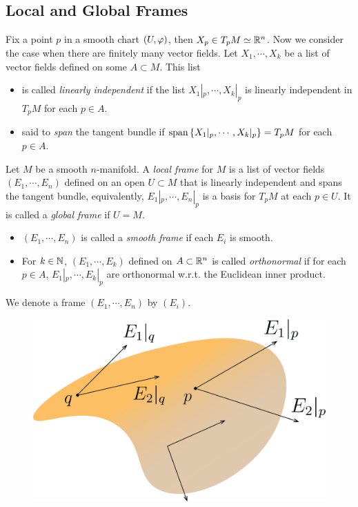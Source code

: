 \subsection{Local and Global Frames}
Fix a point $p$ in a smooth chart $(U,\varphi)$, then $X_p \in T_p M \simeq \mathbb{R}^n$. Now we consider the case when there are finitely many vector fields. Let $X_1,\cdots,X_k$ be a list of vector fields defined on some $A \subset M$. This list  
\begin{itemize}
    \item is called \textit{linearly independent} if the list $X_1|_p, \cdots, X_k|_p$ is linearly independent in $T_pM$ for each $p \in A$. 
    \item said to \textit{span} the tangent bundle if 
    $\mathrm{span} \left\{X_1|_p, \cdots, X_k|_p\right\} = T_pM$ for each $p \in A$. 
\end{itemize}
\begin{definition}[frame]
    Let $M$ be a smooth $n$-manifold.
    A \textit{local frame} for $M$ is a list of vector fields $(E_1,\cdots,E_n)$ defined on an open $U \subset M$ that is linearly independent and spans the tangent bundle, equivalently, 
    $E_1|_p,\cdots,E_n|_p$ is a basis for $T_pM$ at each $p \in U$. It is called a \textit{global frame} if $U=M$. 
    \begin{itemize}
        \item $(E_1,\cdots,E_n)$ is called a \textit{smooth frame} if each $E_i$ is smooth. 
        \item For $k \in \mathbb{N}$, $(E_1,\cdots,E_k)$ defined on $A \subset \mathbb{R}^n$ is called \textit{orthonormal} if for each $p \in A$, $E_1|_p, \cdots, E_k|_p$ are orthonormal w.r.t. the Euclidean inner product. 
    \end{itemize} 
    We denote a frame $(E_1,\cdots,E_n)$ by $(E_i)$. 
\end{definition}
\begin{figure}[h]
    \centering
    \includegraphics[scale=0.5]{figure/frame.png}
\end{figure}






